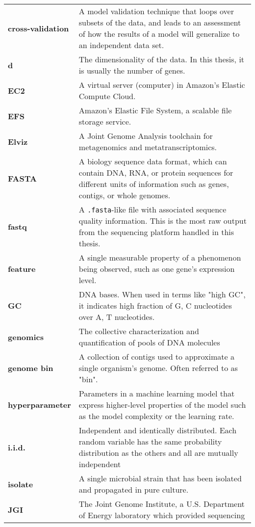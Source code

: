 \begin{singlespace}
\begin{longtable}{ p{}  p{} }
\textbf{cross-validation} &  A model validation technique that loops over subsets of the data, and leads to an assessment of how the results of a model will generalize to an independent data set.  \\
\textbf{d} & The dimensionality of the data.  In this thesis, it is usually the number of genes. \\
\textbf{EC2} & A virtual server (computer) in Amazon's Elastic Compute Cloud. \\
\textbf{EFS} & Amazon's Elastic File System, a scalable file storage service.  \\
\textbf{Elviz} & A Joint Genome Analysis toolchain for metagenomics and metatranscriptomics.  \\
\textbf{FASTA} &  A biology sequence data format, which can contain DNA, RNA, or protein sequences for different units of information such as genes, contigs, or whole genomes.  \\
\textbf{fastq} & A \texttt{.fasta}-like file with associated sequence quality information.  This is the most raw output from the sequencing platform handled in this thesis. \\
\textbf{feature} & A single measurable property of a phenomenon being observed, such as one gene's expression level. \\
\textbf{GC} & DNA bases.  When used in terms like "high GC", it indicates high fraction of G, C nucleotides over A, T nucleotides. \\
\textbf{genomics} & The collective characterization and quantification of pools of DNA molecules \\
\textbf{genome bin} & A collection of contigs used to approximate a single organism's genome.  Often referred to as "bin". \\
\textbf{hyperparameter} & Parameters in a machine learning model that express higher-level properties of the model such as the model complexity or the learning rate. \\
\textbf{i.i.d.} & Independent and identically distributed.
    Each random variable has the same probability distribution as the others and all are mutually independent \\
\textbf{isolate} & A single microbial strain that has been isolated and propagated in pure culture. \\
\textbf{JGI} & The Joint Genome Institute, a U.S. Department of Energy laboratory which provided sequencing

\end{longtable}
\end{singlespace}
